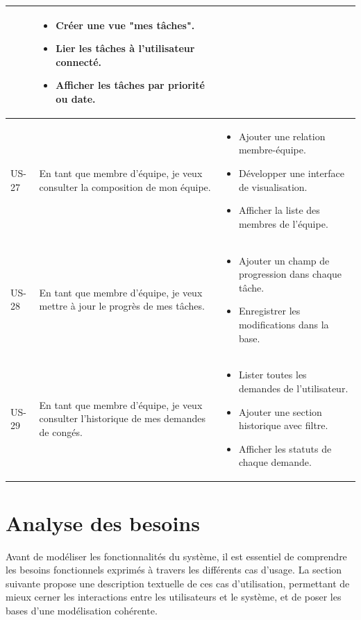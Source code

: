 \begin{table}[H]
\begin{tabular}{|p{1cm}|p{8cm}|p{8cm}|}
& 
\begin{itemize}[leftmargin=*]
  \item Créer une vue "mes tâches".
  \item Lier les tâches à l'utilisateur connecté.
  \item Afficher les tâches par priorité ou date.
\end{itemize} \\
\hline
US-27 & En tant que membre d’équipe, je veux consulter la composition de mon équipe. 
& 
\begin{itemize}[leftmargin=*]
  \item Ajouter une relation membre-équipe.
  \item Développer une interface de visualisation.
  \item Afficher la liste des membres de l’équipe.
\end{itemize} \\
\hline
US-28 & En tant que membre d’équipe, je veux mettre à jour le progrès de mes tâches. 
& 
\begin{itemize}[leftmargin=*]
  \item Ajouter un champ de progression dans chaque tâche.
  \item Enregistrer les modifications dans la base.
\end{itemize} \\
\hline
US-29 & En tant que membre d’équipe, je veux consulter l’historique de mes demandes de congés. 
& 
\begin{itemize}[leftmargin=*]
  \item Lister toutes les demandes de l'utilisateur.
  \item Ajouter une section historique avec filtre.
  \item Afficher les statuts de chaque demande.
\end{itemize} \\
\hline
\end{tabular}
\label{tab:sprint5_backlog}
\end{table}


\section{Analyse des besoins}
Avant de modéliser les fonctionnalités du système, il est essentiel de comprendre les besoins fonctionnels exprimés à travers les différents cas d’usage. La section suivante propose une description textuelle de ces cas d’utilisation, permettant de mieux cerner les interactions entre les utilisateurs et le système, et de poser les bases d’une modélisation cohérente.
    
